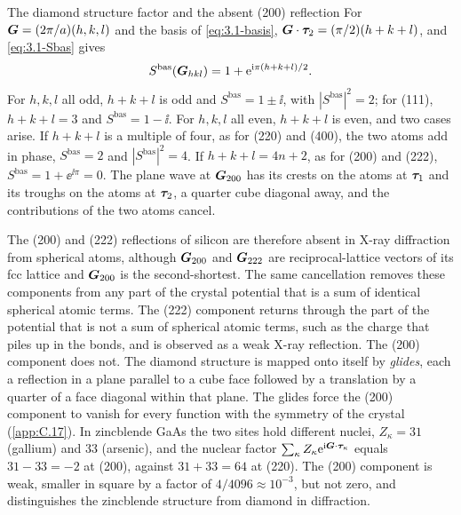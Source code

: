 \begin{workedexample}{The diamond structure factor and the absent (200) reflection}\label{we:3-diamond}
For $\bm{G} = (2\pi/a)(h,k,l)$ and the basis of \cref{eq:3.1-basis}, $\bm{G}\cdot\bm{\tau}_2 = (\pi/2)(h + k + l)$, and \cref{eq:3.1-Sbas} gives
\begin{equation*}
  S^{\mathrm{bas}}(\bm{G}_{hkl}) = 1 + \mathrm{e}^{\mathrm{i}\pi(h + k + l)/2} .
\end{equation*}
For $h, k, l$ all odd, $h + k + l$ is odd and $S^{\mathrm{bas}} = 1 \pm \ii$, with $|S^{\mathrm{bas}}|^2 = 2$; for (111), $h + k + l = 3$ and $S^{\mathrm{bas}} = 1 - \ii$. For $h, k, l$ all even, $h + k + l$ is even, and two cases arise. If $h + k + l$ is a multiple of four, as for (220) and (400), the two atoms add in phase, $S^{\mathrm{bas}} = 2$ and $|S^{\mathrm{bas}}|^2 = 4$. If $h + k + l = 4n + 2$, as for (200) and (222), $S^{\mathrm{bas}} = 1 + \ee^{\ii\pi} = 0$. The plane wave at $\bm{G}_{200}$ has its crests on the atoms at $\bm{\tau}_1$ and its troughs on the atoms at $\bm{\tau}_2$, a quarter cube diagonal away, and the contributions of the two atoms cancel.

The (200) and (222) reflections of silicon are therefore absent in X-ray diffraction from spherical atoms, although $\bm{G}_{200}$ and $\bm{G}_{222}$ are reciprocal-lattice vectors of its fcc lattice and $\bm{G}_{200}$ is the second-shortest. The same cancellation removes these components from any part of the crystal potential that is a sum of identical spherical atomic terms. The (222) component returns through the part of the potential that is not a sum of spherical atomic terms, such as the charge that piles up in the bonds, and is observed as a weak X-ray reflection. The (200) component does not. The diamond structure is mapped onto itself by \emph{glides}, each a reflection in a plane parallel to a cube face followed by a translation by a quarter of a face diagonal within that plane. The glides force the (200) component to vanish for every function with the symmetry of the crystal (\cref{app:C.17}). In zincblende GaAs the two sites hold different nuclei, $Z_\kappa = 31$ (gallium) and 33 (arsenic), and the nuclear factor $\sum_\kappa Z_\kappa\mathrm{e}^{\mathrm{i}\bm{G}\cdot\bm{\tau}_\kappa}$ equals $31 - 33 = -2$ at (200), against $31 + 33 = 64$ at (220). The (200) component is weak, smaller in square by a factor of $4/4096 \approx 10^{-3}$, but not zero, and distinguishes the zincblende structure from diamond in diffraction.
\end{workedexample}
